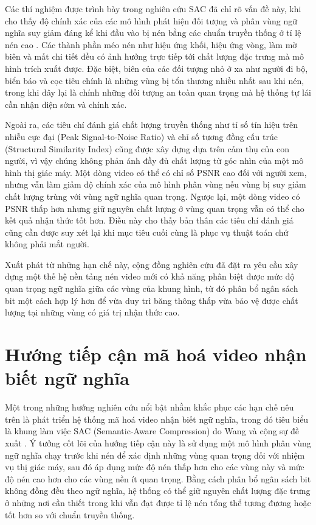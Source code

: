Các thí nghiệm được trình bày trong nghiên cứu SAC đã chỉ rõ vấn đề này, khi cho thấy độ chính xác của các mô hình phát hiện đối tượng và phân vùng ngữ nghĩa suy giảm đáng kể khi đầu vào bị nén bằng các chuẩn truyền thống ở tỉ lệ nén cao \cite{SAC}. Các thành phần méo nén như hiệu ứng khối, hiệu ứng vòng, làm mờ biên và mất chi tiết đều có ảnh hưởng trực tiếp tới chất lượng đặc trưng mà mô hình trích xuất được. Đặc biệt, biên của các đối tượng nhỏ ở xa như người đi bộ, biển báo và cọc tiêu chính là những vùng bị tổn thương nhiều nhất sau khi nén, trong khi đây lại là chính những đối tượng an toàn quan trọng mà hệ thống tự lái cần nhận diện sớm và chính xác.

Ngoài ra, các tiêu chí đánh giá chất lượng truyền thống như tỉ số tín hiệu trên nhiễu cực đại (Peak Signal-to-Noise Ratio) và chỉ số tương đồng cấu trúc (Structural Similarity Index) cũng được xây dựng dựa trên cảm thụ của con người, vì vậy chúng không phản ánh đầy đủ chất lượng từ góc nhìn của một mô hình thị giác máy. Một dòng video có thể có chỉ số PSNR cao đối với người xem, nhưng vẫn làm giảm độ chính xác của mô hình phân vùng nếu vùng bị suy giảm chất lượng trùng với vùng ngữ nghĩa quan trọng. Ngược lại, một dòng video có PSNR thấp hơn nhưng giữ nguyên chất lượng ở vùng quan trọng vẫn có thể cho kết quả nhận thức tốt hơn. Điều này cho thấy bản thân các tiêu chí đánh giá cũng cần được suy xét lại khi mục tiêu cuối cùng là phục vụ thuật toán chứ không phải mắt người.

Xuất phát từ những hạn chế này, cộng đồng nghiên cứu đã đặt ra yêu cầu xây dựng một thế hệ nền tảng nén video mới có khả năng phân biệt được mức độ quan trọng ngữ nghĩa giữa các vùng của khung hình, từ đó phân bổ ngân sách bit một cách hợp lý hơn để vừa duy trì băng thông thấp vừa bảo vệ được chất lượng tại những vùng có giá trị nhận thức cao.

\section{Hướng tiếp cận mã hoá video nhận biết ngữ nghĩa}

Một trong những hướng nghiên cứu nổi bật nhằm khắc phục các hạn chế nêu trên là phát triển hệ thống mã hoá video nhận biết ngữ nghĩa, trong đó tiêu biểu là khung làm việc SAC (Semantic-Aware Compression) do Wang và cộng sự đề xuất \cite{SAC}. Ý tưởng cốt lõi của hướng tiếp cận này là sử dụng một mô hình phân vùng ngữ nghĩa chạy trước khi nén để xác định những vùng quan trọng đối với nhiệm vụ thị giác máy, sau đó áp dụng mức độ nén thấp hơn cho các vùng này và mức độ nén cao hơn cho các vùng nền ít quan trọng. Bằng cách phân bổ ngân sách bit không đồng đều theo ngữ nghĩa, hệ thống có thể giữ nguyên chất lượng đặc trưng ở những nơi cần thiết trong khi vẫn đạt được tỉ lệ nén tổng thể tương đương hoặc tốt hơn so với chuẩn truyền thống.

